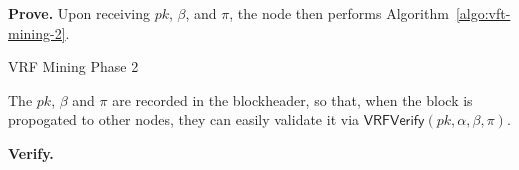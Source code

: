 \textbf{Prove.}
Upon receiving $pk$, $\beta$, and $\pi$, the node then performs Algorithm~\ref{algo:vft-mining-2}.

\begin{algorithm}[H]
\caption{VRF Mining Phase 2}
\label{algo:vft-mining-2}
\SetAlgoLined
{}
\end{algorithm}

The $pk$, $\beta$ and $\pi$ are recorded in the blockheader, so that, when the block is propogated to other nodes, they can easily validate it via $\mathsf{VRFVerify}(pk, \alpha, \beta, \pi)$.




\textbf{Verify.}

